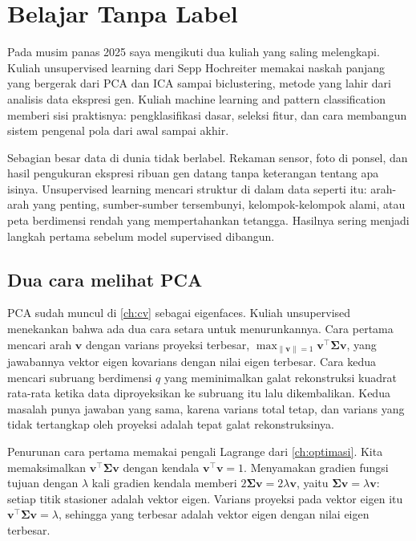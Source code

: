 \chapter{Belajar Tanpa Label}
\label{ch:unsup}

Pada musim panas 2025 saya mengikuti dua kuliah yang saling melengkapi. Kuliah unsupervised
learning dari Sepp Hochreiter memakai naskah panjang yang bergerak dari PCA dan ICA sampai
biclustering, metode yang lahir dari analisis data ekspresi gen. Kuliah machine learning and
pattern classification memberi sisi praktisnya: pengklasifikasi dasar, seleksi fitur, dan cara
membangun sistem pengenal pola dari awal sampai akhir.

Sebagian besar data di dunia tidak berlabel. Rekaman sensor, foto di ponsel, dan hasil
pengukuran ekspresi ribuan gen datang tanpa keterangan tentang apa isinya. Unsupervised learning
mencari struktur di dalam data seperti itu: arah-arah yang penting, sumber-sumber tersembunyi,
kelompok-kelompok alami, atau peta berdimensi rendah yang mempertahankan tetangga. Hasilnya sering
menjadi langkah pertama sebelum model supervised dibangun.

\section{Dua cara melihat PCA}

PCA sudah muncul di \cref{ch:cv} sebagai eigenfaces. Kuliah unsupervised menekankan bahwa ada dua
cara setara untuk menurunkannya. Cara pertama mencari arah $\bm v$ dengan varians proyeksi
terbesar, $\max_{\|\bm v\|=1}\bm v^\top\bm\Sigma\bm v$, yang jawabannya vektor eigen kovarians
dengan nilai eigen terbesar. Cara kedua mencari subruang berdimensi $q$ yang meminimalkan galat
rekonstruksi kuadrat rata-rata ketika data diproyeksikan ke subruang itu lalu dikembalikan. Kedua
masalah punya jawaban yang sama, karena varians total tetap, dan varians yang tidak tertangkap oleh
proyeksi adalah tepat galat rekonstruksinya.

Penurunan cara pertama memakai pengali Lagrange dari \cref{ch:optimasi}. Kita memaksimalkan $\bm v^\top\bm\Sigma\bm v$
dengan kendala $\bm v^\top\bm v=1$. Menyamakan gradien fungsi tujuan dengan $\lambda$ kali gradien kendala memberi
$2\bm\Sigma\bm v=2\lambda\bm v$, yaitu $\bm\Sigma\bm v=\lambda\bm v$: setiap titik stasioner adalah vektor eigen. Varians
proyeksi pada vektor eigen itu $\bm v^\top\bm\Sigma\bm v=\lambda$, sehingga yang terbesar adalah vektor eigen dengan
nilai eigen terbesar.

